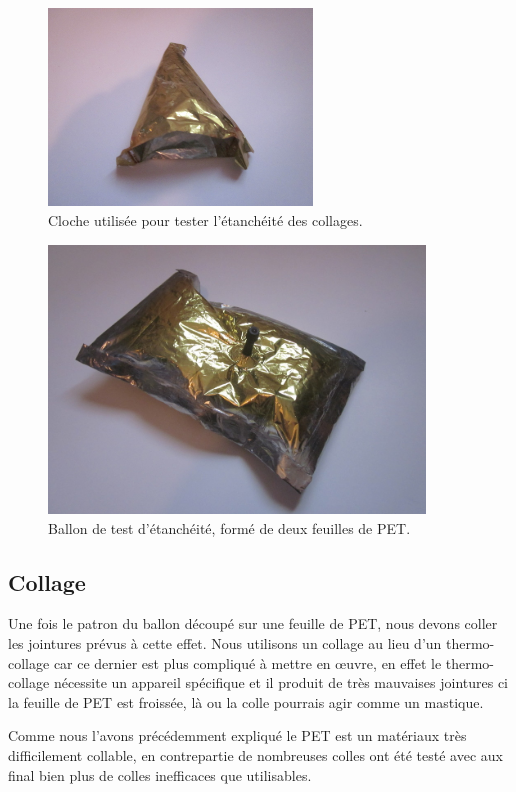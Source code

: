 \documentclass[a4paper,11pt]{article}
\begin{document}
\begin{figure}[H]
 \centering
 \includegraphics[width=7cm]{../Images/cloche_colle.JPG}
 \caption{Cloche utilisée pour tester l'étanchéité des collages.}
\end{figure}

\begin{figure}[H]
 \centering
 \includegraphics[width=10cm]{../Images/ballon_etanche.JPG}
 \caption{Ballon de test d'étanchéité, formé de deux feuilles de PET.}
\end{figure}


\subsection{Collage}

Une fois le patron du ballon découpé sur une feuille de PET, nous devons coller les jointures prévus à cette effet. Nous utilisons un collage au lieu d'un thermo-collage car ce dernier est plus compliqué à mettre en œuvre, en effet le thermo-collage nécessite un appareil spécifique et il produit de très mauvaises jointures ci la feuille de PET est froissée, là ou la colle pourrais agir comme un mastique.

Comme nous l'avons précédemment expliqué le PET est un matériaux très difficilement collable, en contrepartie de nombreuses colles ont été testé avec aux final bien plus de colles inefficaces que utilisables.
\end{document}
